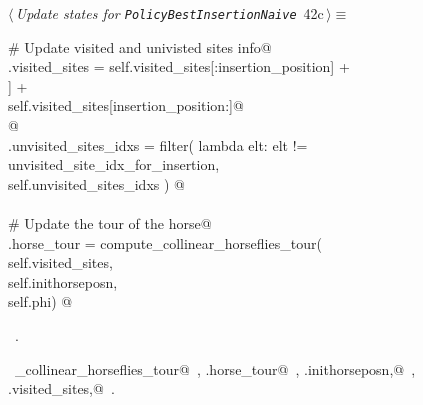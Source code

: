\documentclass[11.5pt]{report}
\begin{document}
\vspace{-0.8cm}\newchunk 

\begin{flushleft} \small\label{scrap64}\raggedright\small
{} $\langle\,${\itshape Update states for \texttt{PolicyBestInsertionNaive}}\nobreak\ {\footnotesize {42c}}$\,\rangle\equiv$
\vspace{-1ex}
\begin{list}{}{} \item
\mbox{}\verb@# Update visited and univisted sites info@\\
\mbox{}\verb@self.visited_sites = self.visited_sites[:insertion_position]      +\@\\
\mbox{}\verb@                     [self.sites[unvisited_site_idx_for_insertion]] +\@\\
\mbox{}\verb@                     self.visited_sites[insertion_position:]@\\
\mbox{}\verb@  @\\
\mbox{}\verb@self.unvisited_sites_idxs = filter( lambda elt: elt != unvisited_site_idx_for_insertion, \@\\
\mbox{}\verb@                                    self.unvisited_sites_idxs ) @\\
\mbox{}\verb@@\\
\mbox{}\verb@# Update the tour of the horse@\\
\mbox{}\verb@self.horse_tour = compute_collinear_horseflies_tour(\@\\
\mbox{}\verb@                           self.visited_sites,         \@\\
\mbox{}\verb@                           self.inithorseposn, \@\\
\mbox{}\verb@                           self.phi) @\\
\mbox{}\verb@@{\NWsep}
\end{list}
\vspace{-1.5ex}
\footnotesize
\begin{list}{}{\setlength{\itemsep}{-\parsep}\setlength{\itemindent}{-\leftmargin}}
\item \NWtxtMacroRefIn\ .
\item \NWtxtIdentsUsed\nobreak\  \verb@compute_collinear_horseflies_tour@\nobreak\ , \verb@self.horse_tour@\nobreak\ , \verb@self.inithorseposn,@\nobreak\ , \verb@self.visited_sites,@\nobreak\ .
\item{}
\end{list}
\vspace{4ex}
\end{flushleft}
\newpage
\end{document}
